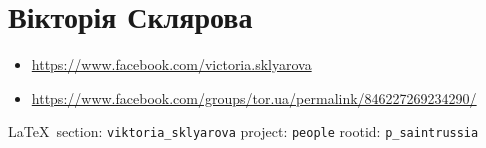  
 
\section{Вікторія Склярова}

\begin{itemize}
	\item \url{https://www.facebook.com/victoria.sklyarova}
	\item \url{https://www.facebook.com/groups/tor.ua/permalink/846227269234290/}
\end{itemize}
  
\vspace{0.5cm}
{\small\LaTeX~section: \verb|viktoria_sklyarova| project: \verb|people| rootid: \verb|p_saintrussia|}
\vspace{0.5cm}



